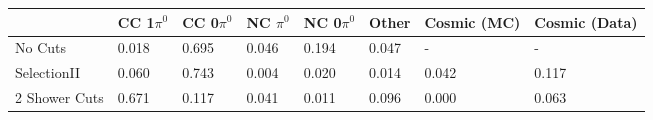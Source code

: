 \documentclass{article}
\begin{document}
\begin{table*}
\centering
{}
 \begin{tabular}{| l | l | l |l|l|l|l|l|}
 \hline
  & CC 1$\pi^0$ & CC 0$\pi^0$ & NC $\pi^0$ & NC 0$\pi^0$ & Other& Cosmic (MC) & Cosmic (Data) \\ [0.1ex] \hline
No Cuts  & 0.018 &  0.695 & 0.046 & 0.194  & 0.047 & -&-\\
SelectionII & 0.060 & 0.743 & 0.004 & 0.020 & 0.014 & 0.042 & 0.117  \\ 
2 Shower Cuts  & 0.671 & 0.117 & 0.041 & 0.011 & 0.096 & 0.000 & 0.063 \\ \hline
\end{tabular}
\end{table*}
\end{document}
